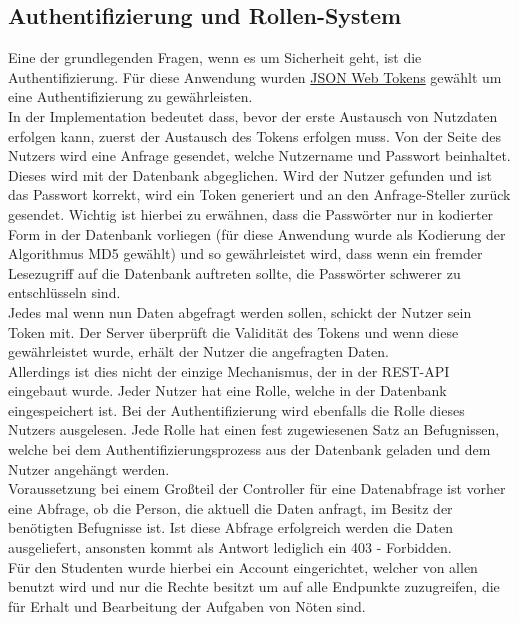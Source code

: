\subsection{Authentifizierung und Rollen-System} \label{RechteSystem}

Eine der grundlegenden Fragen, wenn es um Sicherheit geht, ist die Authentifizierung. Für diese Anwendung wurden \hyperref[JWT]{JSON Web Tokens} gewählt um eine Authentifizierung zu gewährleisten. \\
In der Implementation bedeutet dass, bevor der erste Austausch von Nutzdaten erfolgen kann, zuerst der Austausch des Tokens erfolgen muss. Von der Seite des Nutzers wird eine Anfrage gesendet, welche Nutzername und Passwort beinhaltet. Dieses wird mit der Datenbank abgeglichen. Wird der Nutzer gefunden und ist das Passwort korrekt, wird ein Token generiert und an den Anfrage-Steller zurück gesendet. Wichtig ist hierbei zu erwähnen, dass die Passwörter nur in kodierter Form in der Datenbank vorliegen (für diese Anwendung wurde als Kodierung der Algorithmus MD5 gewählt) und so gewährleistet wird, dass wenn ein fremder Lesezugriff auf die Datenbank auftreten sollte, die Passwörter schwerer zu entschlüsseln sind. \\
Jedes mal wenn nun Daten abgefragt werden sollen, schickt der Nutzer sein Token mit. Der Server überprüft die Validität des Tokens und wenn diese gewährleistet wurde, erhält der Nutzer die angefragten Daten. \\

Allerdings ist dies nicht der einzige Mechanismus, der in der REST-API eingebaut wurde. Jeder Nutzer hat eine Rolle, welche in der Datenbank eingespeichert ist. Bei der Authentifizierung wird ebenfalls die Rolle dieses Nutzers ausgelesen. Jede Rolle hat einen fest zugewiesenen Satz an Befugnissen, welche bei dem Authentifizierungsprozess aus der Datenbank geladen und dem Nutzer angehängt werden. \\
Voraussetzung bei einem Großteil der Controller für eine Datenabfrage ist vorher eine Abfrage, ob die Person, die aktuell die Daten anfragt, im Besitz der benötigten Befugnisse ist. Ist diese Abfrage erfolgreich werden die Daten ausgeliefert, ansonsten kommt als Antwort lediglich ein 403 - Forbidden. \\

Für den Studenten wurde hierbei ein Account eingerichtet, welcher von allen benutzt wird und nur die Rechte besitzt um auf alle Endpunkte zuzugreifen, die für Erhalt und Bearbeitung der Aufgaben von Nöten sind. \\

